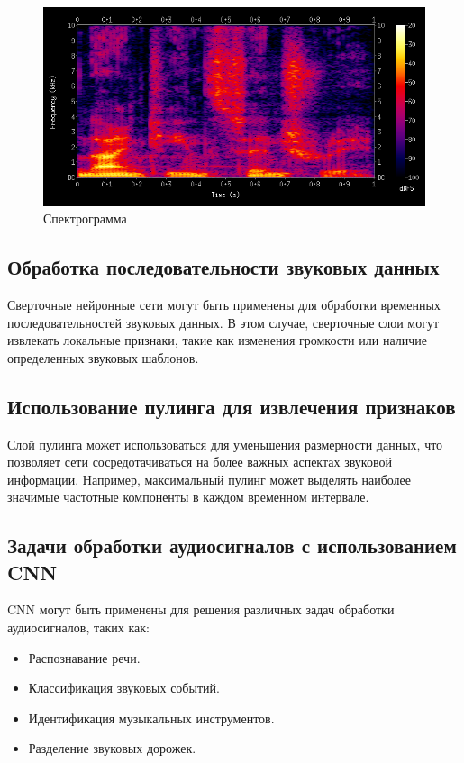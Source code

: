 \documentclass{article}
\theoremstyle{definition}
\theoremstyle{theorem}
\theoremstyle{remark}
\theoremstyle{theorem}
\theoremstyle{example}
\theoremstyle{theorem}
\theoremstyle{theorem}
\theoremstyle{theorem}
\theoremstyle{theorem}
\begin{document}
		\begin{figure}[h!]
			\includegraphics[width=\textwidth]{spec.png}\caption{Спектрограмма}
		\end{figure}
		
		\subsection{Обработка последовательности звуковых данных}
		
		Сверточные нейронные сети могут быть применены для обработки временных последовательностей звуковых данных. В этом случае, сверточные слои могут извлекать локальные признаки, такие как изменения громкости или наличие определенных звуковых шаблонов.
		
		\subsection{Использование пулинга для извлечения признаков}
		
		Слой пулинга может использоваться для уменьшения размерности данных, что позволяет сети сосредотачиваться на более важных аспектах звуковой информации. Например, максимальный пулинг может выделять наиболее значимые частотные компоненты в каждом временном интервале.
		
		\subsection{Задачи обработки аудиосигналов с использованием CNN}
		
		CNN могут быть применены для решения различных задач обработки аудиосигналов, таких как:
		\begin{itemize}
			\item Распознавание речи.
			\item Классификация звуковых событий.
			\item Идентификация музыкальных инструментов.
			\item Разделение звуковых дорожек.
		\end{itemize}
\end{document}
